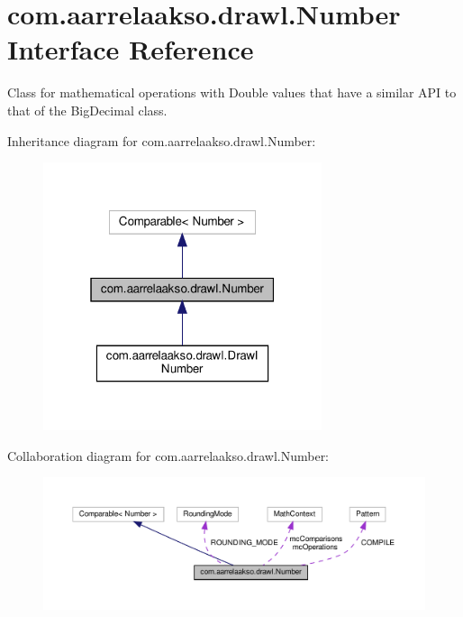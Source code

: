 \hypertarget{interfacecom_1_1aarrelaakso_1_1drawl_1_1_number}{}\section{com.\+aarrelaakso.\+drawl.\+Number Interface Reference}
\label{interfacecom_1_1aarrelaakso_1_1drawl_1_1_number}


Class for mathematical operations with Double values that have a similar A\+PI to that of the Big\+Decimal class.  




Inheritance diagram for com.\+aarrelaakso.\+drawl.\+Number\+:
\nopagebreak
\begin{figure}[H]
\begin{center}
\leavevmode
\includegraphics[width=232pt]{d5/de2/interfacecom_1_1aarrelaakso_1_1drawl_1_1_number__inherit__graph}
\end{center}
\end{figure}


Collaboration diagram for com.\+aarrelaakso.\+drawl.\+Number\+:
\nopagebreak
\begin{figure}[H]
\begin{center}
\leavevmode
\includegraphics[width=350pt]{df/d78/interfacecom_1_1aarrelaakso_1_1drawl_1_1_number__coll__graph}
\end{center}
\end{figure}
